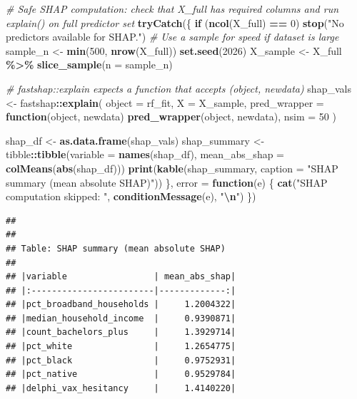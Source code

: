 \documentclass[
  11pt,
]{article}
\newenvironment{Shaded}{\begin{snugshade}}{\end{snugshade}}
\newcommand{\AttributeTok}[1]{\textcolor[rgb]{0.13,0.29,0.53}{#1}}
\newcommand{\CommentTok}[1]{\textcolor[rgb]{0.56,0.35,0.01}{\textit{#1}}}
\newcommand{\ControlFlowTok}[1]{\textcolor[rgb]{0.13,0.29,0.53}{\textbf{#1}}}
\newcommand{\DecValTok}[1]{\textcolor[rgb]{0.00,0.00,0.81}{#1}}
\newcommand{\FunctionTok}[1]{\textcolor[rgb]{0.13,0.29,0.53}{\textbf{#1}}}
\newcommand{\NormalTok}[1]{#1}
\newcommand{\OtherTok}[1]{\textcolor[rgb]{0.56,0.35,0.01}{#1}}
\newcommand{\SpecialCharTok}[1]{\textcolor[rgb]{0.81,0.36,0.00}{\textbf{#1}}}
\newcommand{\StringTok}[1]{\textcolor[rgb]{0.31,0.60,0.02}{#1}}
\begin{document}
\begin{Shaded}
\begin{Highlighting}[]
\CommentTok{\# Safe SHAP computation: check that X\_full has required columns and run explain() on full predictor set}
\FunctionTok{tryCatch}\NormalTok{(\{}
  \ControlFlowTok{if}\NormalTok{ (}\FunctionTok{ncol}\NormalTok{(X\_full) }\SpecialCharTok{==} \DecValTok{0}\NormalTok{) }\FunctionTok{stop}\NormalTok{(}\StringTok{"No predictors available for SHAP."}\NormalTok{)}
  \CommentTok{\# Use a sample for speed if dataset is large}
\NormalTok{  sample\_n }\OtherTok{\textless{}{-}} \FunctionTok{min}\NormalTok{(}\DecValTok{500}\NormalTok{, }\FunctionTok{nrow}\NormalTok{(X\_full))}
  \FunctionTok{set.seed}\NormalTok{(}\DecValTok{2026}\NormalTok{)}
\NormalTok{  X\_sample }\OtherTok{\textless{}{-}}\NormalTok{ X\_full }\SpecialCharTok{\%\textgreater{}\%} \FunctionTok{slice\_sample}\NormalTok{(}\AttributeTok{n =}\NormalTok{ sample\_n)}

  \CommentTok{\# fastshap::explain expects a function that accepts (object, newdata)}
\NormalTok{  shap\_vals }\OtherTok{\textless{}{-}}\NormalTok{ fastshap}\SpecialCharTok{::}\FunctionTok{explain}\NormalTok{(}
    \AttributeTok{object =}\NormalTok{ rf\_fit,}
    \AttributeTok{X =}\NormalTok{ X\_sample,}
    \AttributeTok{pred\_wrapper =} \ControlFlowTok{function}\NormalTok{(object, newdata) }\FunctionTok{pred\_wrapper}\NormalTok{(object, newdata),}
    \AttributeTok{nsim =} \DecValTok{50}
\NormalTok{  )}

\NormalTok{  shap\_df }\OtherTok{\textless{}{-}} \FunctionTok{as.data.frame}\NormalTok{(shap\_vals)}
\NormalTok{  shap\_summary }\OtherTok{\textless{}{-}}\NormalTok{ tibble}\SpecialCharTok{::}\FunctionTok{tibble}\NormalTok{(}\AttributeTok{variable =} \FunctionTok{names}\NormalTok{(shap\_df), }\AttributeTok{mean\_abs\_shap =} \FunctionTok{colMeans}\NormalTok{(}\FunctionTok{abs}\NormalTok{(shap\_df)))}
  \FunctionTok{print}\NormalTok{(}\FunctionTok{kable}\NormalTok{(shap\_summary, }\AttributeTok{caption =} \StringTok{"SHAP summary (mean absolute SHAP)"}\NormalTok{))}
\NormalTok{\}, }\AttributeTok{error =} \ControlFlowTok{function}\NormalTok{(e) \{}
  \FunctionTok{cat}\NormalTok{(}\StringTok{"SHAP computation skipped: "}\NormalTok{, }\FunctionTok{conditionMessage}\NormalTok{(e), }\StringTok{"}\SpecialCharTok{\textbackslash{}n}\StringTok{"}\NormalTok{)}
\NormalTok{\})}
\end{Highlighting}
\end{Shaded}

\begin{verbatim}
## 
## 
## Table: SHAP summary (mean absolute SHAP)
## 
## |variable                 | mean_abs_shap|
## |:------------------------|-------------:|
## |pct_broadband_households |     1.2004322|
## |median_household_income  |     0.9390871|
## |count_bachelors_plus     |     1.3929714|
## |pct_white                |     1.2654775|
## |pct_black                |     0.9752931|
## |pct_native               |     0.9529784|
## |delphi_vax_hesitancy     |     1.4140220|
\end{verbatim}
\end{document}
